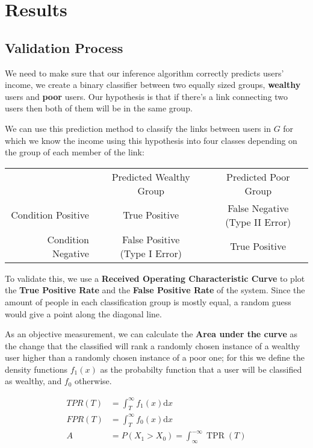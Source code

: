 \section{Results}

\subsection{Validation Process}

We need to make sure that our inference algorithm correctly predicts users' income, we create a binary classifier between two equally sized groups, \textbf{wealthy} users and \textbf{poor} users. Our hypothesis is that if there's a link connecting two users then both of them will be in the same group.

We can use this prediction method to classify the links between users in $ G $ for which we know the income using this hypothesis into four classes depending on the group of each member of the link:

\begin{tabularx}{\textwidth}{ r c c }
& Predicted Wealthy Group & Predicted Poor Group \\
Condition Positive & \cellcolor{green} True Positive & \cellcolor{red} \makecell{False Negative \\ (Type II Error)} \\ 
Condition Negative & \cellcolor{red} \makecell{False Positive \\ (Type I Error)} & \cellcolor{green} True Positive \\
\end{tabularx}

To validate this, we use a \textbf{Received Operating Characteristic Curve} to plot the \textbf{True Positive Rate} and the \textbf{False Positive Rate} of the system. Since the amount of people in each classification group is mostly equal, a random guess would give a point along the diagonal line.

As an objective measurement, we can calculate the \textbf{Area under the curve} as the change that the classified will rank a randomly chosen instance of a wealthy user higher than a randomly chosen instance of a poor one; for this we define the density functions $ f_1(x) $ as the probabilty function that a user will be classified as wealthy, and $ f_0 $ otherwise.

\begin{align*}
TPR(T) &= \int^{\infty}_T f_1(x) \mathrm{d}x \\
FPR(T) &= \int^{\infty}_T f_0(x) \mathrm{d}x \\
A &= P(X_1 > X_0) = \int^{-\infty}_{\infty} \operatorname{TPR}(T) 
\end{align*}